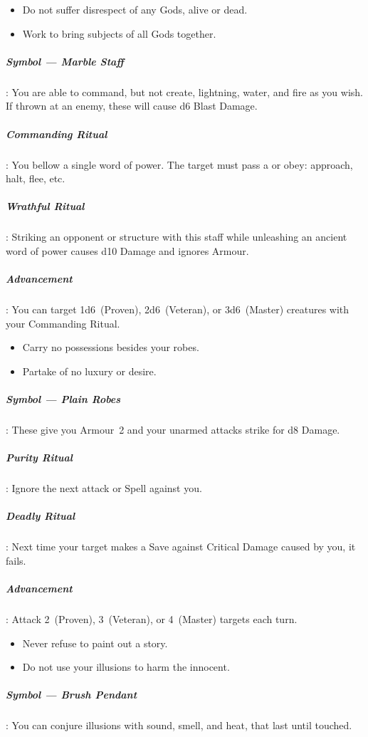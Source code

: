 \documentclass[itdr]{subfiles}
\begin{document}
{\em\begin{itemize}
		\item Do not suffer disrespect of any Gods, alive or dead.
		\item Work to bring subjects of all Gods together.
\end{itemize}}

\subparagraph{Symbol --- Marble Staff}: You are able to command, but not create, lightning, water, and fire as you wish. If thrown at an enemy, these will cause d6 Blast Damage.

\subparagraph{Commanding Ritual}: You bellow a single word of power. The target must pass a  or obey: approach, halt, flee, etc.

\subparagraph{Wrathful Ritual}: Striking an opponent or structure with this staff while unleashing an ancient word of power causes d10 Damage and ignores Armour.

\subparagraph{Advancement}: You can target 1d6~(Proven), 2d6~(Veteran), or 3d6~(Master) creatures with your Commanding Ritual.

\vfill

{\em\begin{itemize}
		\item Carry no possessions besides your robes.
		\item Partake of no luxury or desire.
\end{itemize}}

\subparagraph{Symbol --- Plain Robes}: These give you Armour~2 and your unarmed attacks strike for d8 Damage.

\subparagraph{Purity Ritual}: Ignore the next attack or Spell against you.

\subparagraph{Deadly Ritual}: Next time your target makes a Save against Critical Damage caused by you, it fails.

\subparagraph{Advancement}: Attack 2~(Proven), 3~(Veteran), or 4~(Master) targets each turn.

\vfill
\break

{\em\begin{itemize}
		\item Never refuse to paint out a story.
		\item Do not use your illusions to harm the innocent.
\end{itemize}}

\subparagraph{Symbol --- Brush Pendant}: You can conjure illusions with sound, smell, and heat, that last until touched.
\end{document}
